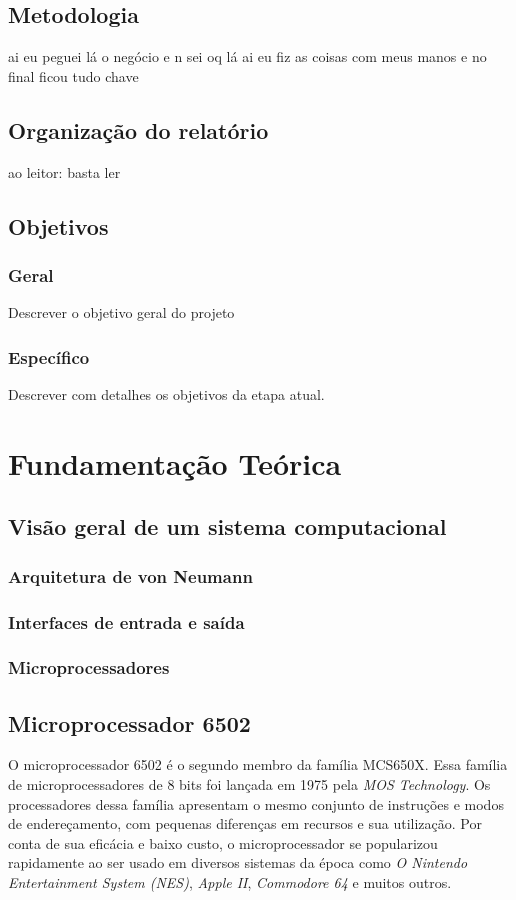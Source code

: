\documentclass[
	12pt,				  %
	openright,		%
	a4paper,			%
	english,			%
	french,				%
	spanish,			%
	brazil,				%
]{abntex2}
\begin{document}
\section{Metodologia}
ai eu peguei lá o negócio e n sei oq lá ai eu fiz as coisas
com meus manos e no final ficou tudo chave
\section{Organização do relatório}
ao leitor: basta ler
\section{Objetivos}
\subsection*{Geral}
Descrever o objetivo geral do projeto
\subsection*{Específico}
Descrever com detalhes os objetivos da etapa atual.

\chapter{Fundamentação Teórica}

\section{Visão geral de um sistema computacional}
\subsection{Arquitetura de von Neumann}
\subsection{Interfaces de entrada e saída}
\subsection{Microprocessadores}

\section{Microprocessador 6502}

O microprocessador 6502 é o segundo membro da família MCS650X. Essa família de
microprocessadores de 8 bits foi lançada em 1975 pela \emph{MOS Technology}.
Os processadores dessa família apresentam o mesmo conjunto de instruções e modos
de endereçamento, com pequenas diferenças em recursos e sua utilização. Por
conta de sua eficácia e baixo custo, o microprocessador se popularizou
rapidamente ao ser usado em diversos sistemas da época como \emph{O Nintendo
	Entertainment System (NES)}, \emph{Apple II}, \emph{Commodore 64} e muitos
outros.
\end{document}
